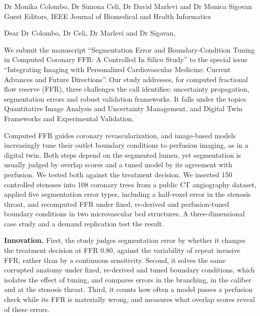 \documentclass[10pt]{letter}
\date{\today}
\begin{document}
\begin{letter}{Dr Monika Colombo, Dr Simona Celi, Dr David Marlevi and Dr Monica Sigovan\\Guest Editors, IEEE Journal of Biomedical and Health Informatics}
\opening{Dear Dr Colombo, Dr Celi, Dr Marlevi and Dr Sigovan,}

We submit the manuscript ``Segmentation Error and Boundary-Condition Tuning in Computed Coronary FFR: A Controlled In Silico Study'' to the special issue ``Integrating Imaging with Personalized Cardiovascular Medicine: Current Advances and Future Directions''. Our study addresses, for computed fractional flow reserve (FFR), three challenges the call identifies: uncertainty propagation, segmentation errors and robust validation frameworks. It falls under the topics Quantitative Image Analysis and Uncertainty Management, and Digital Twin Frameworks and Experimental Validation.

Computed FFR guides coronary revascularization, and image-based models increasingly tune their outlet boundary conditions to perfusion imaging, as in a digital twin. Both steps depend on the segmented lumen, yet segmentation is usually judged by overlap scores and a tuned model by its agreement with perfusion. We tested both against the treatment decision. We inserted 150 controlled stenoses into 108 coronary trees from a public CT angiography dataset, applied five segmentation error types, including a half-voxel error in the stenosis throat, and recomputed FFR under fixed, re-derived and perfusion-tuned boundary conditions in two microvascular bed structures. A three-dimensional case study and a demand replication test the result.

\textbf{Innovation.} First, the study judges segmentation error by whether it changes the treatment decision at FFR 0.80, against the variability of repeat invasive FFR, rather than by a continuous sensitivity. Second, it solves the same corrupted anatomy under fixed, re-derived and tuned boundary conditions, which isolates the effect of tuning, and compares errors in the branching, in the caliber and at the stenosis throat. Third, it counts how often a model passes a perfusion check while its FFR is materially wrong, and measures what overlap scores reveal of these errors.


\end{letter}
\end{document}

